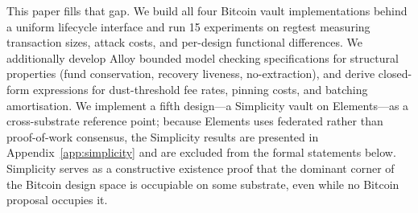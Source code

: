 This paper fills that gap. We build all four Bitcoin vault
implementations behind a uniform lifecycle interface and run 15
experiments on regtest measuring transaction sizes, attack costs,
and per-design functional differences. We additionally develop Alloy
bounded model checking specifications for structural properties (fund
conservation, recovery liveness, no-extraction), and derive
closed-form expressions for dust-threshold fee rates, pinning costs,
and batching amortisation. We implement a fifth design---a Simplicity
vault on Elements---as a cross-substrate reference point; because
Elements uses federated rather than proof-of-work consensus, the
Simplicity results are presented in Appendix~\ref{app:simplicity} and
are excluded from the formal statements below. Simplicity serves as
a constructive existence proof that the dominant corner of the
Bitcoin design space is occupiable on some substrate, even
while no Bitcoin proposal occupies it.

